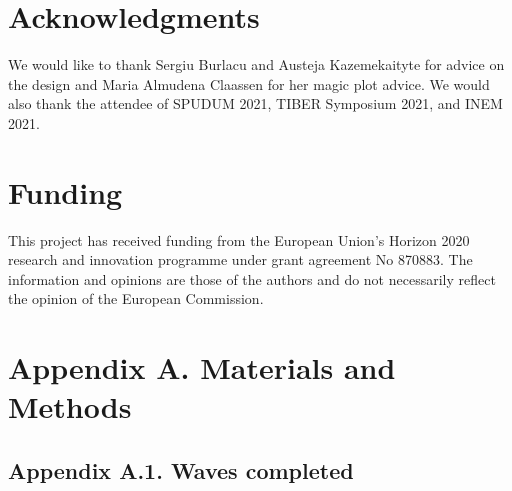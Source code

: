 \documentclass[authordate, empirical]{jote-new-article}
\begin{document}
\section{Acknowledgments}



We would like to thank Sergiu Burlacu and Austeja Kazemekaityte for advice on the design and Maria Almudena Claassen for her magic plot advice. We would also thank the attendee of SPUDUM 2021, TIBER Symposium 2021, and INEM 2021.


\section{Funding}
This project has received funding from the European Union's Horizon 2020 research and innovation programme under grant agreement No 870883. The information and opinions are those of the authors and do not necessarily reflect the opinion of the European Commission.

\printbibliography

\clearpage
\onecolumn
\appendix





\section{Appendix A. Materials and Methods}



\subsection{Appendix A.1. Waves completed}
\end{document}
